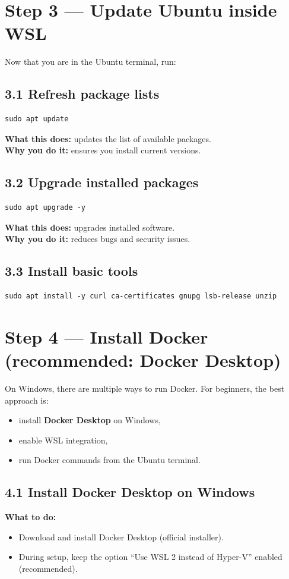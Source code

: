 \section{Step 3 --- Update Ubuntu inside WSL}
Now that you are in the Ubuntu terminal, run:

\subsection{3.1 Refresh package lists}
\begin{lstlisting}
sudo apt update
\end{lstlisting}
\textbf{What this does:} updates the list of available packages. \\
\textbf{Why you do it:} ensures you install current versions.

\subsection{3.2 Upgrade installed packages}
\begin{lstlisting}
sudo apt upgrade -y
\end{lstlisting}
\textbf{What this does:} upgrades installed software. \\
\textbf{Why you do it:} reduces bugs and security issues.

\subsection{3.3 Install basic tools}
\begin{lstlisting}
sudo apt install -y curl ca-certificates gnupg lsb-release unzip
\end{lstlisting}

\section{Step 4 --- Install Docker (recommended: Docker Desktop)}
On Windows, there are multiple ways to run Docker. For beginners, the best approach is:
\begin{itemize}[leftmargin=*]
  \item install \textbf{Docker Desktop} on Windows,
  \item enable WSL integration,
  \item run Docker commands from the Ubuntu terminal.
\end{itemize}

\subsection{4.1 Install Docker Desktop on Windows}
\textbf{What to do:}
\begin{itemize}[leftmargin=*]
  \item Download and install Docker Desktop (official installer).
  \item During setup, keep the option ``Use WSL 2 instead of Hyper-V'' enabled (recommended).
\end{itemize}


